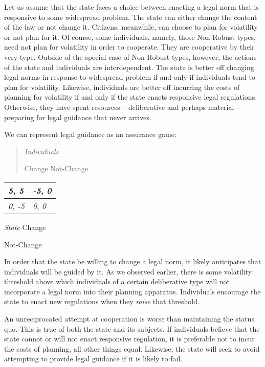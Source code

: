 Let us assume that the state faces a choice between enacting a legal
norm that is responsive to some widespread problem. The state can either
change the content of the law or not change it. Citizens, meanwhile, can
choose to plan for volatility or not plan for it. Of course, some
individuals, namely, those Non-Robust types, need not plan for
volatility in order to cooperate. They are cooperative by their very
type. Outside of the special case of Non-Robust types, however, the
actions of the state and individuals are interdependent. The state is
better off changing legal norms in response to widespread problem if and
only if individuals tend to plan for volatility. Likewise, individuals
are better off incurring the costs of planning for volatility if and
only if the state enacts responsive legal regulations. Otherwise, they
have spent resources -- deliberative and perhaps material -- preparing
for legal guidance that never arrives.

We can represent legal guidance as an assurance game:

\begin{quote}
\emph{Individuals}

Change Not-Change
\end{quote}

\begin{longtable}[c]{@{}ll@{}}
\toprule
\emph{5}, \emph{5} & \emph{-5}, \emph{0}\tabularnewline
\midrule
\endhead
\emph{0}, \emph{-5} & \emph{0}, \emph{0}\tabularnewline
\bottomrule
\end{longtable}

\emph{State} Change

Not-Change

In order that the state be willing to change a legal norm, it likely
anticipates that individuals will be guided by it. As we observed
earlier, there is some volatility threshold above which individuals of a
certain deliberative type will not incorporate a legal norm into their
planning apparatus. Individuals encourage the state to enact new
regulations when they \emph{raise} that threshold.

An unreciprocated attempt at cooperation is worse than maintaining the
status quo. This is true of both the state and its subjects. If
individuals believe that the state cannot or will not enact responsive
regulation, it is preferable not to incur the costs of planning, all
other things equal. Likewise, the state will seek to avoid attempting to
provide legal guidance if it is likely to fail.

